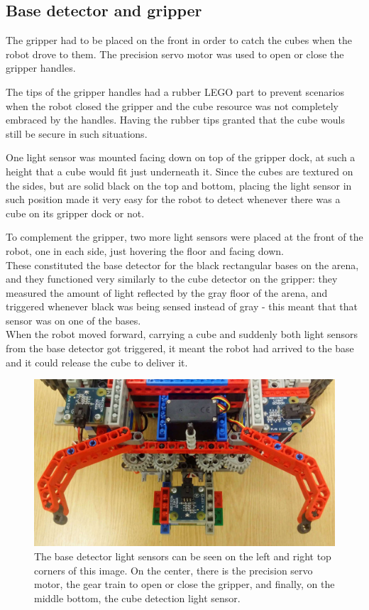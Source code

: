 
\subsection{Base detector and gripper}

The gripper had to be placed on the front in order to catch the cubes when the robot drove to them. The precision servo motor was used to open or close the gripper handles.

The tips of the gripper handles had a rubber LEGO part to prevent scenarios when the robot closed the gripper and the cube resource was not completely embraced by the handles. Having the rubber tips granted that the cube wouls still be secure in such situations.

One light sensor was mounted facing down on top of the gripper dock, at such a height that a cube would fit just underneath it. Since the cubes are textured on the sides, but are solid black on the top and bottom, placing the light sensor in such position made it very easy for the robot to detect whenever there was a cube on its gripper dock or not.

To complement the gripper, two more light sensors were placed at the front of the robot, one in each side, just hovering the floor and facing down.\\
These constituted the base detector for the black rectangular bases on the arena, and they functioned very similarly to the cube detector on the gripper: they measured the amount of light reflected by the gray floor of the arena, and triggered whenever black was being sensed instead of gray - this meant that that sensor was on one of the bases.\\
When the robot moved forward, carrying a cube and suddenly both light sensors from the base detector got triggered, it meant the robot had arrived to the base and it could release the cube to deliver it.

\bigskip

\begin{figure}[ht]
    \centering
    \includegraphics[width=0.7\linewidth]{res/robot-pics/base-detector-and-gripper.jpg}
    \caption{The base detector light sensors can be seen on the left and right top corners of this image. On the center, there is the precision servo motor, the gear train to open or close the gripper, and finally, on the middle bottom, the cube detection light sensor.}
    \label{fig:base-detector-and-gripper}
\end{figure}

